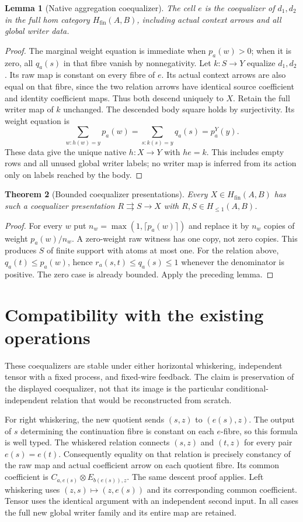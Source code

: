 \documentclass[11pt]{article}
\newtheorem{theorem}{Theorem}
\newtheorem{lemma}[theorem]{Lemma}
\newcommand{\Ha}{H_{\leq 1}}
\newcommand{\HM}{H_{\mathrm{fin}}}
\newcommand{\Hh}{\HM}
\newcommand{\Bb}{\Ha}
\begin{document}
\begin{lemma}[Native aggregation coequalizer]
The cell $e$ is the coequalizer of $d_1,d_2$ in the full hom category
$\Hh(A,B)$, including actual context arrows and all global writer data.
\end{lemma}
\begin{proof}
The marginal weight equation is immediate when $p_a(w)>0$; when it is zero,
all $q_a(s)$ in that fibre vanish by nonnegativity. Let $k:S\to Y$ equalize
$d_1,d_2$. Its raw map is constant on every fibre of $e$. Its actual context
arrows are also equal on that fibre, since the two relation arrows have
identical source coefficient and identity coefficient maps. Thus both
descend uniquely to $X$. Retain the full writer map of $k$ unchanged.
The descended body square holds by surjectivity. Its weight equation is
\[
 \sum_{w:h(w)=y}p_a(w)
 =\sum_{s:k(s)=y}q_a(s)=p^Y_a(y).
\]
These data give the unique native $h:X\to Y$ with $he=k$.
This includes empty rows and all unused global writer labels; no writer map
is inferred from its action only on labels reached by the body.
\end{proof}

\begin{theorem}[Bounded coequalizer presentations]
Every $X\in\Hh(A,B)$ has such a coequalizer presentation
$R\rightrightarrows S\to X$ with $R,S\in\Bb(A,B)$.
\end{theorem}
\begin{proof}
For every $w$ put $n_w=\max(1,\lceil p_a(w)\rceil)$ and replace it by
$n_w$ copies of weight $p_a(w)/n_w$. A zero-weight raw witness has one copy,
not zero copies. This produces $S$ of finite support with atoms at most one.
For the relation above, $q_a(t)\leq p_a(w)$, hence
$r_a(s,t)\leq q_a(s)\leq1$ whenever the denominator is positive.
The zero case is already bounded. Apply the preceding lemma.
\end{proof}

\section{Compatibility with the existing operations}
These coequalizers are stable under either horizontal whiskering, independent
tensor with a fixed process, and fixed-wire feedback. The claim is preservation
of the displayed coequalizer, not that its image is the particular
conditional-independent relation that would be reconstructed from scratch.

For right whiskering, the new quotient sends $(s,z)$ to $(e(s),z)$.
The output of $s$ determining the continuation fibre is constant on each
$e$-fibre, so this formula is well typed. The whiskered relation connects
$(s,z)$ and $(t,z)$ for every pair $e(s)=e(t)$. Consequently equality on
that relation is precisely constancy of the raw map and actual coefficient
arrow on each quotient fibre. Its common coefficient is
$C_{a,e(s)}\otimes E_{b(e(s)),z}$. The same descent proof applies.
Left whiskering uses $(z,s)\mapsto(z,e(s))$ and its corresponding common
coefficient. Tensor uses the identical argument with an independent second
input. In all cases the full new global writer family and its entire map
are retained.
\end{document}

